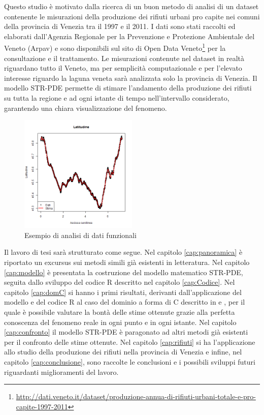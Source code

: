 \documentclass[a4paper,11pt,twoside,openright]{book}							%
\begin{document}
Questo studio è motivato dalla ricerca di un buon metodo di analisi di un dataset contenente le misurazioni della produzione dei rifiuti urbani pro capite nei comuni della provincia di Venezia tra il 1997 e il 2011. I dati sono stati raccolti ed elaborati dall'Agenzia Regionale per la Prevenzione e Protezione Ambientale del Veneto (Arpav) e sono disponibili sul sito di Open Data Veneto\footnote{\href{http://dati.veneto.it/dataset/produzione-annua-di-rifiuti-urbani-totale-e-pro-capite-1997-2011}{http://dati.veneto.it/dataset/produzione-annua-di-rifiuti-urbani-totale-e-pro-capite-1997-2011}} per la consultazione e il trattamento. Le misurazioni contenute nel dataset in realtà riguardano tutto il Veneto, ma per semplicità computazionale e per l'elevato interesse riguardo la laguna veneta sarà analizzata solo la provincia di Venezia. Il modello STR-PDE permette di stimare l'andamento della produzione dei rifiuti su tutta la regione e ad ogni istante di tempo nell'intervallo considerato, garantendo una chiara visualizzazione del fenomeno.

\begin{figure}[t]
	\centering
	\includegraphics[width=0.50\textwidth]{Immagini/Ven_Latitudinefda.png}   
	\caption{Esempio di analisi di dati funzionali}
	\label{fig:fda}
\end{figure}

Il lavoro di tesi sarà strutturato come segue. Nel capitolo \ref{cap:panoramica} è riportato un excursus sui metodi simili già esistenti in letteratura. Nel capitolo \ref{cap:modello} è presentata la costruzione del modello matematico STR-PDE, seguita dallo sviluppo del codice R descritto nel capitolo \ref{cap:Codice}. Nel capitolo \ref{cap:domC} si hanno i primi risultati, derivanti dall'applicazione del modello e del codice R al caso del dominio a forma di C descritto in \cite{art:ramsay} e \cite{art:wood}, per il quale è possibile valutare la bontà delle stime ottenute grazie alla perfetta conoscenza del fenomeno reale in ogni punto e in ogni istante. Nel capitolo \ref{cap:confronto} il modello STR-PDE è paragonato ad altri metodi già esistenti per il confronto delle stime ottenute. Nel capitolo \ref{cap:rifiuti} si ha l'applicazione allo studio della produzione dei rifiuti nella provincia di Venezia e infine, nel capitolo \ref{cap:conclusione}, sono raccolte le conclusioni e i possibili sviluppi futuri riguardanti miglioramenti del lavoro.
\newpage
\thispagestyle{empty}
\end{document}
